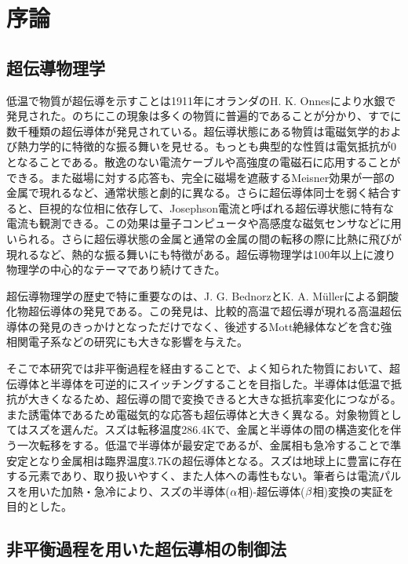 \section{序論}
\subsection{超伝導物理学}
低温で物質が超伝導を示すことは1911年にオランダのH. K. Onnesにより水銀で発見された。のちにこの現象は多くの物質に普遍的であることが分かり、すでに数千種類の超伝導体が発見されている。超伝導状態にある物質は電磁気学的および熱力学的に特徴的な振る舞いを見せる。もっとも典型的な性質は電気抵抗が0となることである。散逸のない電流ケーブルや高強度の電磁石に応用することができる。また磁場に対する応答も、完全に磁場を遮蔽するMeisner効果が一部の金属で現れるなど、通常状態と劇的に異なる。さらに超伝導体同士を弱く結合すると、巨視的な位相に依存して、Josephson電流と呼ばれる超伝導状態に特有な電流も観測できる。この効果は量子コンピュータや高感度な磁気センサなどに用いられる。さらに超伝導状態の金属と通常の金属の間の転移の際に比熱に飛びが現れるなど、熱的な振る舞いにも特徴がある。超伝導物理学は100年以上に渡り物理学の中心的なテーマであり続けてきた。

超伝導物理学の歴史で特に重要なのは、J. G. BednorzとK. A. M\"ullerによる銅酸化物超伝導体の発見である。この発見は、比較的高温で超伝導が現れる高温超伝導体の発見のきっかけとなっただけでなく、後述するMott絶縁体などを含む強相関電子系などの研究にも大きな影響を与えた。

そこで本研究では非平衡過程を経由することで、よく知られた物質において、超伝導体と半導体を可逆的にスイッチングすることを目指した。半導体は低温で抵抗が大きくなるため、超伝導の間で変換できると大きな抵抗率変化につながる。また誘電体であるため電磁気的な応答も超伝導体と大きく異なる。対象物質としてはスズを選んだ。スズは転移温度286.4Kで、金属と半導体の間の構造変化を伴う一次転移をする。低温で半導体が最安定であるが、金属相も急冷することで準安定となり金属相は臨界温度3.7Kの超伝導体となる。スズは地球上に豊富に存在する元素であり、取り扱いやすく、また人体への毒性もない。筆者らは電流パルスを用いた加熱・急冷により、スズの半導体($\rm \alpha$相)-超伝導体($\rm \beta$相)変換の実証を目的とした。

\subsection{非平衡過程を用いた超伝導相の制御法}


